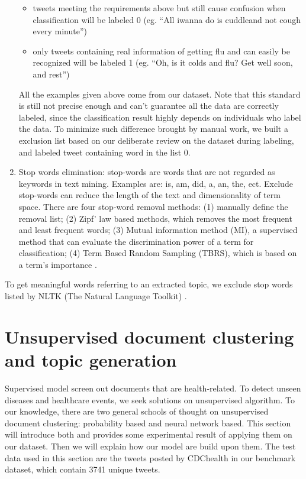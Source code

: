 \begin{enumerate}
\begin{itemize}
        \item tweets meeting the requirements above but still cause confusion when classification will be labeled 0 (eg. ``All iwanna do is cuddleand not cough every minute'')
        \item only tweets containing real information of getting flu and can easily be recognized will be labeled 1 (eg. ``Oh, is it colds and flu? Get well soon, and rest'')
    \end{itemize} 
    All the examples given above come from our dataset. Note that this standard is still not precise enough and can't guarantee all the data are correctly labeled, since the classification result highly depends on individuals who label the data. To minimize such difference brought by manual work, we built a exclusion list based on our deliberate review on the dataset during labeling, and labeled tweet containing word in the list 0.
    \item Stop words elimination: stop-words are words that are not regarded as keywords in text mining. Examples are: is, am, did, a, an, the, ect. Exclude stop-words can reduce the length of the text and dimensionality of term space\cite{vijayarani2015preprocessing}. There are four stop-word removal methods: (1) manually define the removal list; (2) Zipf' law based methods, which removes the most frequent and least frequent words; (3) Mutual information method (MI), a supervised method that can evaluate the discrimination power of a term for classification; (4) Term Based Random Sampling (TBRS), which is based on a term's importance \cite{jivani2011comparative}. 
\end{enumerate}

To get meaningful words referring to an extracted topic, we exclude stop words listed by NLTK (The Natural Language Toolkit) \cite{journals/corr/cs-CL-0205028}.

\section{Unsupervised document clustering and topic generation}
\label{sec:unsupervised}
Supervised model screen out documents that are health-related. To detect unseen diseases and healthcare events, we seek solutions on unsupervised algorithm. To our knowledge, there are two general schools of thought on unsupervised document clustering: probability based and neural network based. This section will introduce both and provides some experimental result of applying them on our dataset. Then we will explain how our model are build upon them. The test data used in this section are the tweets posted by CDChealth in our benchmark dataset, which contain 3741 unique tweets.

